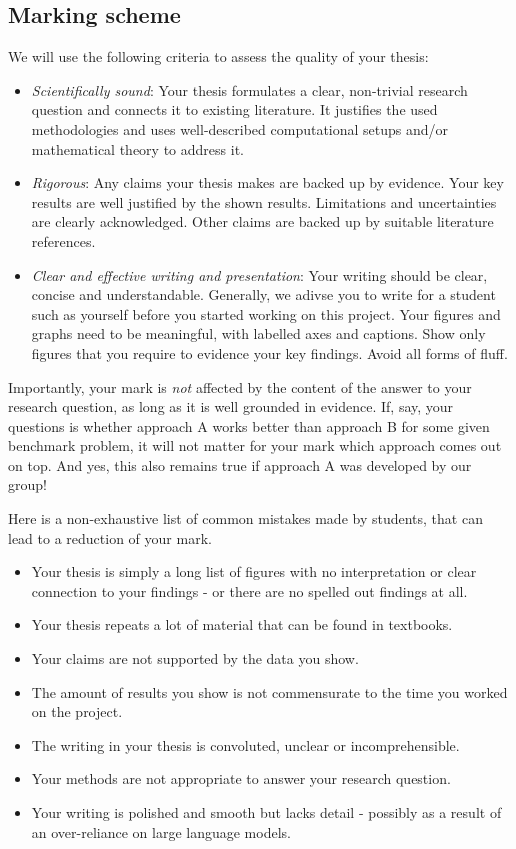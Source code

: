 \documentclass[conference]{IEEEtran}
\begin{document}
\subsection{Marking scheme}
We will use the following criteria to assess the quality of your thesis:
\begin{itemize}
 \item \emph{Scientifically sound}: Your thesis formulates a clear, non-trivial research question and connects it to existing literature. It justifies the used methodologies and uses well-described computational setups and/or mathematical theory to address it.
 \item \emph{Rigorous}: Any claims your thesis makes are backed up by evidence. Your key results are well justified by the shown results. Limitations and uncertainties are clearly acknowledged. Other claims are backed up by suitable literature references.
 \item \emph{Clear and effective writing and presentation}: Your writing should be clear, concise and understandable. Generally, we adivse you to write for a student such as yourself before you started working on this project. Your figures and graphs need to be meaningful, with labelled axes and captions. Show only figures that you require to evidence your key findings. Avoid all forms of fluff.
\end{itemize}
Importantly, your mark is \emph{not} affected by the content of the answer to your research question, as long as it is well grounded in evidence.
If, say, your questions is whether approach A works better than approach B for some given benchmark problem, it will not matter for your mark which approach comes out on top.
And yes, this also remains true if approach A was developed by our group!

Here is a non-exhaustive list of common mistakes made by students, that can lead to a reduction of your mark.
\begin{itemize}
 \item Your thesis is simply a long list of figures with no interpretation or clear connection to your findings - or there are no spelled out findings at all.
 \item Your thesis repeats a lot of material that can be found in textbooks. 
 \item Your claims are not supported by the data you show.
 \item The amount of results you show is not commensurate to the time you worked on the project.
 \item The writing in your thesis is convoluted, unclear or incomprehensible.
 \item Your methods are not appropriate to answer your research question.
 \item Your writing is polished and smooth but lacks detail - possibly as a result of an over-reliance on large language models.
\end{itemize}
\end{document}
